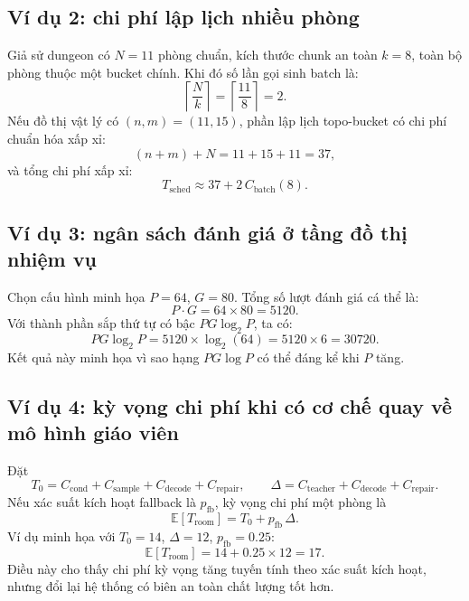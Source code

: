 \documentclass[oneside,a4paper,12pt]{extreport}
\begin{document}
\subsection{Ví dụ 2: chi phí lập lịch nhiều phòng}
Giả sử dungeon có $N=11$ phòng chuẩn, kích thước chunk an toàn $k=8$, toàn bộ phòng thuộc một bucket chính. Khi đó số lần gọi sinh batch là:
\begin{equation}
\left\lceil\frac{N}{k}\right\rceil=\left\lceil\frac{11}{8}\right\rceil=2.
\end{equation}
Nếu đồ thị vật lý có $(n,m)=(11,15)$, phần lập lịch topo-bucket có chi phí chuẩn hóa xấp xỉ:
\begin{equation}
(n+m)+N=11+15+11=37,
\end{equation}
và tổng chi phí xấp xỉ:
\begin{equation}
T_{\text{sched}}\approx 37+2\,C_{\text{batch}}(8).
\end{equation}

\subsection{Ví dụ 3: ngân sách đánh giá ở tầng đồ thị nhiệm vụ}
Chọn cấu hình minh họa $P=64$, $G=80$. Tổng số lượt đánh giá cá thể là:
\begin{equation}
P\cdot G=64\times 80=5120.
\end{equation}
Với thành phần sắp thứ tự có bậc $PG\log_2P$, ta có:
\begin{equation}
PG\log_2P=5120\times \log_2(64)=5120\times 6=30720.
\end{equation}
Kết quả này minh họa vì sao hạng $PG\log P$ có thể đáng kể khi $P$ tăng.

\subsection{Ví dụ 4: kỳ vọng chi phí khi có cơ chế quay về mô hình giáo viên}
Đặt
\begin{equation}
T_0=C_{\text{cond}}+C_{\text{sample}}+C_{\text{decode}}+C_{\text{repair}},
\qquad
\Delta=C_{\text{teacher}}+C_{\text{decode}}+C_{\text{repair}}.
\end{equation}
Nếu xác suất kích hoạt fallback là $p_{\text{fb}}$, kỳ vọng chi phí một phòng là
\begin{equation}
\mathbb{E}[T_{\text{room}}]=T_0+p_{\text{fb}}\,\Delta.
\end{equation}
Ví dụ minh họa với $T_0=14$, $\Delta=12$, $p_{\text{fb}}=0.25$:
\begin{equation}
\mathbb{E}[T_{\text{room}}]=14+0.25\times 12=17.
\end{equation}
Điều này cho thấy chi phí kỳ vọng tăng tuyến tính theo xác suất kích hoạt, nhưng đổi lại hệ thống có biên an toàn chất lượng tốt hơn.
\end{document}
